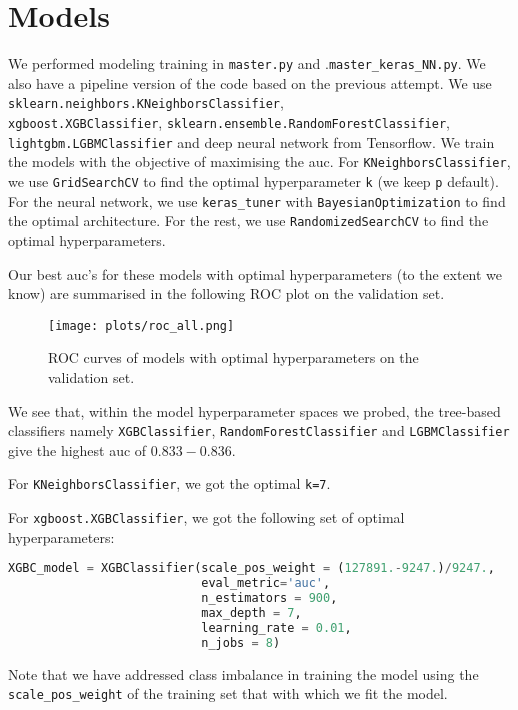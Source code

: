 \documentclass[12pt,letterpaper]{article}
\numberwithin{equation}{section}
\begin{document}
\section{Models}

We performed modeling training in \verb|master.py| and .\verb|master_keras_NN.py|. We also have a pipeline version of the code based on the previous attempt. We use \\\verb|sklearn.neighbors.KNeighborsClassifier|, \\\verb|xgboost.XGBClassifier|, \verb|sklearn.ensemble.RandomForestClassifier|, \\\verb|lightgbm.LGBMClassifier| and deep neural network from Tensorflow. We train the models with the objective of maximising the auc. For \verb|KNeighborsClassifier|, we use \verb|GridSearchCV| to find the optimal hyperparameter \verb|k| (we keep \verb|p| default). For the neural network, we use \verb|keras_tuner| with \verb|BayesianOptimization| to find the optimal architecture. For the rest, we use \verb|RandomizedSearchCV| to find the optimal hyperparameters.


Our best auc's for these models with optimal hyperparameters (to the extent we know) are summarised in the following ROC plot on the validation set.

\begin{figure}[H]
\begin{center}
\texttt{[image: plots/roc\_all.png]}
\caption{ROC curves of models with optimal hyperparameters on the validation set.}\label{rocplots}
\end{center}
\end{figure}

We see that, within the model hyperparameter spaces we probed, the tree-based classifiers namely \verb|XGBClassifier|, \verb|RandomForestClassifier| and \verb|LGBMClassifier| give the highest auc of $0.833-0.836$. 

For \verb|KNeighborsClassifier|, we got the optimal \verb|k=7|.

For \verb|xgboost.XGBClassifier|, we got the following set of optimal hyperparameters:
\begin{lstlisting}[language=Python, basicstyle=\footnotesize]
XGBC_model = XGBClassifier(scale_pos_weight = (127891.-9247.)/9247., 
                           eval_metric='auc', 
                           n_estimators = 900, 
                           max_depth = 7,
                           learning_rate = 0.01,
                           n_jobs = 8)
\end{lstlisting}
Note that we have addressed class imbalance in training the model using the \verb|scale_pos_weight| of the training set that with which we fit the model.
\end{document}
